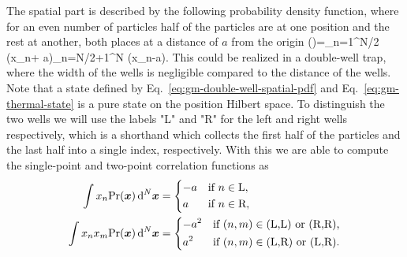 The spatial part is described by the following probability density function, where for an even number of particles half of the particles are at one position and the rest at another, both places at a distance of $a$ from the origin
\be
  \prob()=\prod_{n=1}^{N/2} \delta(x_n+ a)\prod_{n=N/2+1}^{N} \delta(x_n-a).
  \label{eq:gm-double-well-spatial-pdf}
\ee
This could be realized in a double-well trap, where the width of the wells is negligible compared to the distance of the wells.
Note that a state defined by Eq.~\eqref{eq:gm-double-well-spatial-pdf} and Eq.~\eqref{eq:gm-thermal-state} is a pure state on the position Hilbert space.
To distinguish the two wells we will use the labels "L" and "R" for the left and right wells respectively, which is a shorthand which collects the first half of the particles and the last half into a single index, respectively.
With this we are able to compute the single-point and two-point correlation functions as
\begin{align}
  \int  x_n\text{Pr}(\boldsymbol{x})\,\text{d}^N\boldsymbol{x} &= \left\{
  \begin{aligned}
    & {-a} && \text{if }  n\in \text{L},\\
    &  a   && \text{if }  n\in \text{R},
  \end{aligned}\right.
  \label{eq:single-point-function-double-well}\\
  \int x_n x_m\text{Pr}(\boldsymbol{x})\,\text{d}^N\boldsymbol{x} &= \left\{
  \begin{aligned}
    &{-a^2} && \text{if } (n,m)\in \text{(L,L) or (R,R),}\\
    & a^2   && \text{if } (n,m)\in \text{(L,R) or (L,R).}
  \end{aligned}
  \right.
  \label{eq:two-point-function-double-well}
\end{align}

